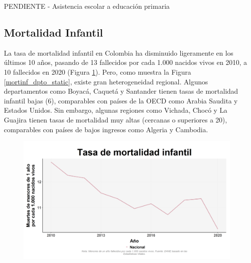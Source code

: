         PENDIENTE - Asistencia escolar a educación primaria

    \subsection{Mortalidad Infantil}

        La tasa de mortalidad infantil en Colombia ha disminuido ligeramente en los últimos 10 años, pasando de 13 fallecidos por cada 1.000 nacidos vivos en 2010, a 10 fallecidos en 2020 (Figura \ref{mortinf_nal_trend}). Pero, como muestra la Figura \ref{mortinf_dpto_static}, existe gran heterogeneidad regional. Algunos departamentos como Boyacá, Caquetá y Santander tienen tasas de mortalidad infantil bajas (6), comparables con países de la OECD como Arabia Saudita y Estados Unidos. Sin embargo, algunas regiones como Vichada, Chocó y La Guajira tienen tasas de mortalidad muy altas (cercanas o superiores a 20), comparables con países de bajos ingresos como Algeria y Cambodia.

    \begin{figure}[H]
        \caption[Tasa de mortalidad infantil a nivel nacional ]{\label{mortinf_nal_trend} }
        \begin{center}
        \includegraphics[width=\textwidth,keepaspectratio]{img/var_291_trend.png}
        \end{center}
    \end{figure}

